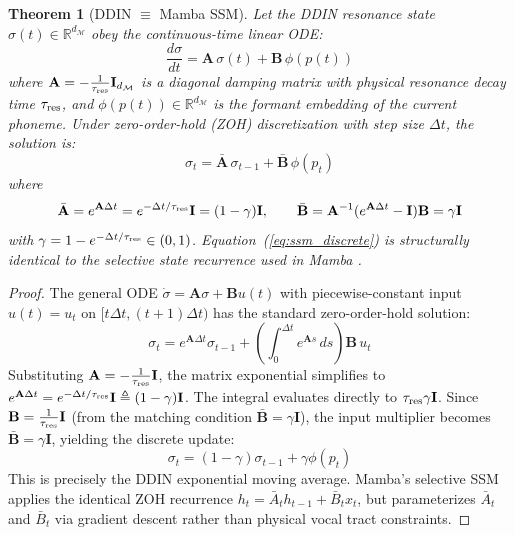 \documentclass{article}
\newtheorem{theorem}{Theorem}
\begin{document}
\begin{theorem}[DDIN $\equiv$ Mamba SSM]
\label{thm:ssm}
Let the DDIN resonance state $\sigma(t) \in \mathbb{R}^{d_\mathcal{M}}$ obey the continuous-time linear ODE:
\begin{equation}
\frac{d\sigma}{dt} = \mathbf{A}\,\sigma(t) + \mathbf{B}\,\phi(p(t))
\label{eq:ssm_ode}
\end{equation}
where $\mathbf{A} = -\frac{1}{\tau_{\rm res}}\mathbf{I}_{d_\mathcal{M}}$ is a diagonal damping matrix with physical resonance decay time $\tau_{\rm res}$, and $\phi(p(t)) \in \mathbb{R}^{d_\mathcal{M}}$ is the formant embedding of the current phoneme. Under zero-order-hold (ZOH) discretization with step size $\Delta t$, the solution is:
\begin{equation}
\sigma_t = \bar{\mathbf{A}}\,\sigma_{t-1} + \bar{\mathbf{B}}\,\phi(p_t)
\label{eq:ssm_discrete}
\end{equation}
where
\begin{equation}
\bar{\mathbf{A}} = e^{\mathbf{A}\Delta t} = e^{-\Delta t/\tau_{\rm res}}\mathbf{I} = (1-\gamma)\mathbf{I}, \qquad \bar{\mathbf{B}} = \mathbf{A}^{-1}(e^{\mathbf{A}\Delta t} - \mathbf{I})\mathbf{B} = \gamma\mathbf{I}
\label{eq:zoh}
\end{equation}
with $\gamma = 1 - e^{-\Delta t/\tau_{\rm res}} \in (0,1)$. Equation~(\ref{eq:ssm_discrete}) is structurally identical to the selective state recurrence used in Mamba \cite{gu2022mamba}.
\end{theorem}

\begin{proof}
The general ODE $\dot{\sigma} = \mathbf{A}\sigma + \mathbf{B}u(t)$ with piecewise-constant input $u(t) = u_{t}$ on $[t\Delta t, (t+1)\Delta t)$ has the standard zero-order-hold solution:
\[
\sigma_{t} = e^{\mathbf{A}\Delta t}\sigma_{t-1} + \left(\int_0^{\Delta t} e^{\mathbf{A}s}\,ds\right)\mathbf{B}\,u_t
\]
Substituting $\mathbf{A} = -\frac{1}{\tau_{\rm res}}\mathbf{I}$, the matrix exponential simplifies to $e^{\mathbf{A}\Delta t} = e^{-\Delta t/\tau_{\rm res}}\mathbf{I} \triangleq (1-\gamma)\mathbf{I}$.
The integral evaluates directly to $\tau_{\rm res}\gamma\mathbf{I}$. Since $\mathbf{B} = \frac{1}{\tau_{\rm res}}\mathbf{I}$ (from the matching condition $\bar{\mathbf{B}} = \gamma\mathbf{I}$), the input multiplier becomes $\bar{\mathbf{B}} = \gamma\mathbf{I}$, yielding the discrete update:
\[
\sigma_t = (1-\gamma)\sigma_{t-1} + \gamma\phi(p_t)
\]
This is precisely the DDIN exponential moving average. Mamba's selective SSM applies the identical ZOH recurrence $h_t = \bar{A}_t h_{t-1} + \bar{B}_t x_t$, but parameterizes $\bar{A}_t$ and $\bar{B}_t$ via gradient descent rather than physical vocal tract constraints.
\end{proof}
\end{document}
